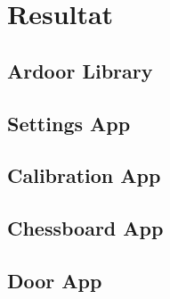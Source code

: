\chapter{Resultat}

\section{Ardoor Library}

\section{Settings App}

\section{Calibration App}

\section{Chessboard App}

\section{Door App}

